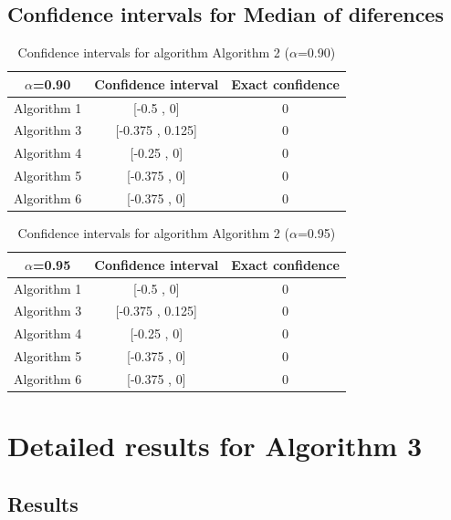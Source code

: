 \documentclass[a4paper,10pt]{article}
\begin{document}
\subsection{Confidence intervals for Median of diferences}

\begin{table}[!htp]
\centering\small
\begin{tabular}{
|c|c|c|}
\hline
 $\alpha$=0.90 & Confidence interval & Exact confidence \\ \hline 
Algorithm 1 & [-0.5 , 0] & 0\\ \hline 
Algorithm 3 & [-0.375 , 0.125] & 0\\ \hline 
Algorithm 4 & [-0.25 , 0] & 0\\ \hline 
Algorithm 5 & [-0.375 , 0] & 0\\ \hline 
Algorithm 6 & [-0.375 , 0] & 0\\ \hline 

\end{tabular}
\caption{Confidence intervals for algorithm Algorithm 2 ($\alpha$=0.90)}
\end{table}
\begin{table}[!htp]
\centering\small
\begin{tabular}{
|c|c|c|}
\hline
 $\alpha$=0.95 & Confidence interval & Exact confidence \\ \hline 
Algorithm 1 & [-0.5 , 0] & 0\\ \hline 
Algorithm 3 & [-0.375 , 0.125] & 0\\ \hline 
Algorithm 4 & [-0.25 , 0] & 0\\ \hline 
Algorithm 5 & [-0.375 , 0] & 0\\ \hline 
Algorithm 6 & [-0.375 , 0] & 0\\ \hline 

\end{tabular}
\caption{Confidence intervals for algorithm Algorithm 2 ($\alpha$=0.95)}
\end{table}

 \clearpage 


\section{Detailed results for Algorithm 3}


\subsection{Results}
\end{document}
